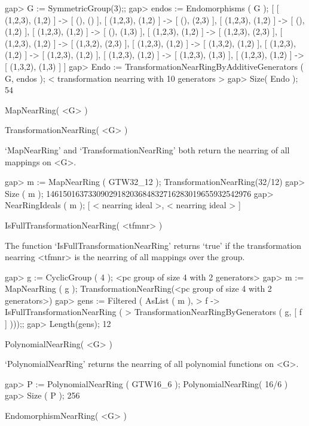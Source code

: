 \beginexample
    gap> G := SymmetricGroup(3);;
    gap> endos := Endomorphisms ( G );
    [ [ (1,2,3), (1,2) ] -> [ (), () ], [ (1,2,3), (1,2) ] -> [ (), (2,3) ], 
      [ (1,2,3), (1,2) ] -> [ (), (1,2) ], [ (1,2,3), (1,2) ] -> [ (), (1,3) ], 
      [ (1,2,3), (1,2) ] -> [ (1,2,3), (2,3) ], 
      [ (1,2,3), (1,2) ] -> [ (1,3,2), (2,3) ], 
      [ (1,2,3), (1,2) ] -> [ (1,3,2), (1,2) ], 
      [ (1,2,3), (1,2) ] -> [ (1,2,3), (1,2) ], 
      [ (1,2,3), (1,2) ] -> [ (1,2,3), (1,3) ], 
      [ (1,2,3), (1,2) ] -> [ (1,3,2), (1,3) ] ]
    gap> Endo := TransformationNearRingByAdditiveGenerators ( G, endos );
    < transformation nearring with 10 generators >
    gap> Size( Endo );
    54
\endexample



\>MapNearRing( <G> )

\>TransformationNearRing( <G> )

`MapNearRing' and `TransformationNearRing' both return the nearring of all
mappings on <G>.

\beginexample
    gap> m := MapNearRing ( GTW32_12 );
    TransformationNearRing(32/12)
    gap> Size ( m );
    1461501637330902918203684832716283019655932542976
    gap> NearRingIdeals ( m );
    [ < nearring ideal >, < nearring ideal > ]
\endexample

\>IsFullTransformationNearRing( <tfmnr> )

The function `IsFullTransformationNearRing' returns `true' if the
transformation nearring <tfmnr> is the nearring of all mappings over
the group.

\beginexample
    gap> g := CyclicGroup ( 4 );
    <pc group of size 4 with 2 generators>
    gap> m := MapNearRing ( g );
    TransformationNearRing(<pc group of size 4 with 2 generators>)
    gap> gens := Filtered ( AsList ( m ), 
    >       f -> IsFullTransformationNearRing ( 
    >               TransformationNearRingByGenerators ( g, [ f ] )));;
    gap> Length(gens);
    12
\endexample

\>PolynomialNearRing( <G> )

`PolynomialNearRing' returns the nearring of all polynomial functions on <G>.

\beginexample
    gap> P := PolynomialNearRing ( GTW16_6 );
    PolynomialNearRing( 16/6 )
    gap> Size ( P );
    256
\endexample
    
\>EndomorphismNearRing( <G> )

